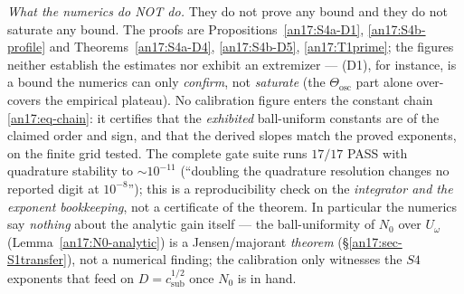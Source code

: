 \begin{remark}
\emph{What the numerics do NOT do.} They do not prove any bound and they do not
saturate any bound. The proofs are Propositions~\ref{an17:S4a-D1},
\ref{an17:S4b-profile} and Theorems~\ref{an17:S4a-D4}, \ref{an17:S4b-D5},
\ref{an17:T1prime}; the figures neither establish the estimates nor exhibit an
extremizer --- (D1), for instance, is a bound the numerics can only \emph{confirm},
not \emph{saturate} (the $\Theta_{\mathrm{osc}}$ part alone over-covers the
empirical plateau). No calibration figure enters the constant chain
\eqref{an17:eq-chain}: it certifies that the \emph{exhibited} ball-uniform
constants are of the claimed order and sign, and that the derived slopes match the
proved exponents, on the finite grid tested. The complete gate suite runs
$17/17$ \textup{PASS} with quadrature stability to $\sim10^{-11}$ (``doubling the
quadrature resolution changes no reported digit at $10^{-8}$''); this is a
reproducibility check on the \emph{integrator and the exponent bookkeeping}, not a
certificate of the theorem. In particular the numerics say \emph{nothing} about
the analytic gain itself --- the ball-uniformity of $N_0$ over $U_\omega$
(Lemma~\ref{an17:N0-analytic}) is a Jensen/majorant \emph{theorem}
(\S\ref{an17:sec-S1transfer}), not a numerical finding; the calibration only
witnesses the $S4$ exponents that feed on $D=c_{\mathrm{sub}}^{1/2}$ once $N_0$ is
in hand.
\end{remark}

